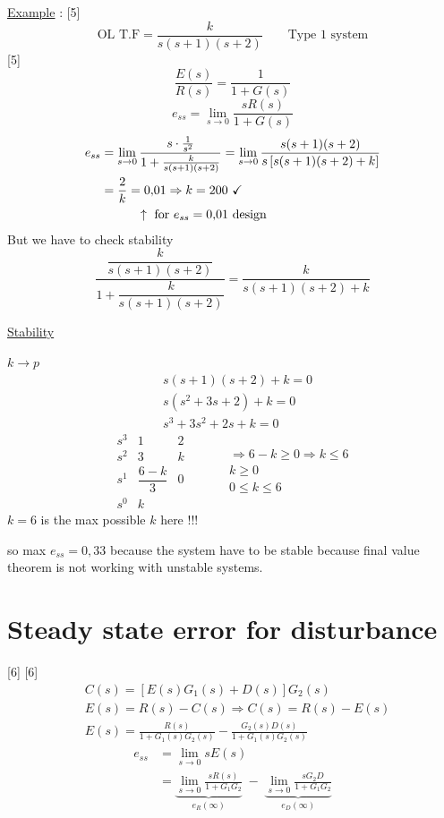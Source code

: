 \documentclass[11pt,a4paper]{article}
\begin{document}
\underline{Example} :
[5]
\[ \text{OL T.F}=\frac{k}{s(s+1)(s+2)}\qquad\text{Type 1 system} \]
[5]
\[ \frac{E(s)}{R(s)}=\frac{1}{1+G(s)} \]
\[ e_{ss}=\lim_{s\to0}\frac{sR(s)}{1+G(s)} \]
\begin{align*}
e_{ss}&=\lim_{s\to0}\frac{s\cdot\frac{1}{s^{2}}}{1+\frac{k}{s(s+1)(s+2)}}=\lim_{s\to0}\frac{s(s+1)(s+2)}{s\left[s(s+1)(s+2)+k\right]}\\
&=\frac{2}{k}=0{,}01\Rightarrow k=200\ \checkmark\\
&\hphantom{=\frac{2}{k}=}\uparrow\ \text{for }e_{ss}=0{,}01\text{ design}
\end{align*}
But we have to check stability
\[ \frac{\dfrac{k}{s(s+1)(s+2)}}{1+\dfrac{k}{s(s+1)(s+2)}}=\frac{k}{s(s+1)(s+2)+k} \]

\underline{Stability}

$k\rightarrow p$
\begin{align*}
&s(s+1)(s+2)+k=0\\
&s(s^{2}+3s+2)+k=0\\
&s^{3}+3s^{2}+2s+k=0
\end{align*}
\[
\begin{array}{ccc}
s^{3}&1&2\\
s^{2}&3&k\\
s^{1}&\dfrac{6-k}{3}&0\\
s^{0}&k&
\end{array}
\qquad
\begin{aligned}
&\Rightarrow 6-k\geq0\Rightarrow k\leq6\\
&k\geq0\\
&0\leq k\leq6
\end{aligned}
\]
$k=6$ is the max possible $k$ here !!!

so max $e_{ss}=0{,}33$ because the system have to be stable because final value theorem is not working with unstable systems.

\section{Steady state error for disturbance}
[6]
[6]
\begin{align*}
&C(s)=\left[E(s)G_1(s)+D(s)\right]G_2(s)\\
&E(s)=R(s)-C(s)\Rightarrow C(s)=R(s)-E(s)\\
&E(s)=\frac{R(s)}{1+G_1(s)G_2(s)}-\frac{G_2(s)D(s)}{1+G_1(s)G_2(s)}
\end{align*}
\begin{align*}
e_{ss}&=\lim_{s\to0}sE(s)\\
&=\underbrace{\lim_{s\to0}\frac{sR(s)}{1+G_1G_2}}_{e_R(\infty)}\;-\;\underbrace{\lim_{s\to0}\frac{sG_2D}{1+G_1G_2}}_{e_D(\infty)}
\end{align*}
\end{document}
